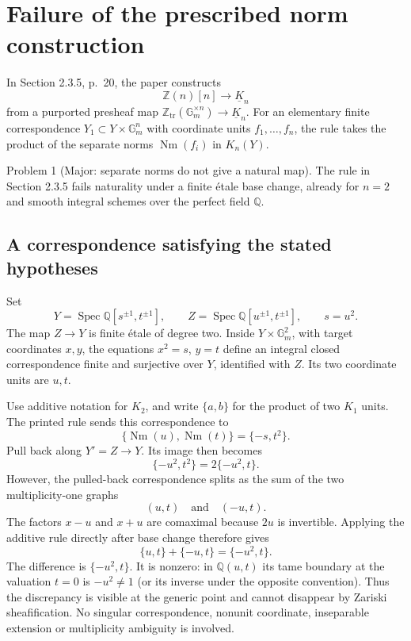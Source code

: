 \documentclass[10pt]{article}
\begin{document}
\section*{Failure of the prescribed norm construction}
In Section 2.3.5, p. 20, the paper constructs \[\mathbb Z(n)[n]\longrightarrow \underline K_n \tag{2.16}\] from a purported presheaf map \(\mathbb Z_{\mathrm{tr}}(\mathbb G_m^{\times n})\to\underline K_n\). For an elementary finite correspondence \(Y_1\subset Y\times\mathbb G_m^n\) with coordinate units \(f_1,\ldots,f_n\), the rule takes the product of the separate norms \(\operatorname{Nm}(f_i)\) in \(K_n(Y)\).\par
Problem 1 (Major: separate norms do not give a natural map).  The rule in Section 2.3.5 fails naturality under a finite étale base change, already for \(n=2\) and smooth integral schemes over the perfect field \(\mathbb Q\).\par
\subsection*{A correspondence satisfying the stated hypotheses}
Set \[Y=\operatorname{Spec}\mathbb Q[s^{\pm1},t^{\pm1}],\qquad
 Z=\operatorname{Spec}\mathbb Q[u^{\pm1},t^{\pm1}],\qquad s=u^2.\] The map \(Z\to Y\) is finite étale of degree two. Inside \(Y\times\mathbb G_m^2\), with target coordinates \(x,y\), the equations \(x^2=s\), \(y=t\) define an integral closed correspondence finite and surjective over \(Y\), identified with \(Z\). Its two coordinate units are \(u,t\).\par
Use additive notation for \(K_2\), and write \(\{a,b\}\) for the product of two \(K_1\) units. The printed rule sends this correspondence to \[\{\operatorname{Nm}(u),\operatorname{Nm}(t)\}
       =\{-s,t^2\}.\] Pull back along \(Y'=Z\to Y\). Its image then becomes \[\{-u^2,t^2\}=2\{-u^2,t\}.\] However, the pulled-back correspondence splits as the sum of the two multiplicity-one graphs \[(u,t)\quad\text{and}\quad(-u,t).\] The factors \(x-u\) and \(x+u\) are comaximal because \(2u\) is invertible. Applying the additive rule directly after base change therefore gives \[\{u,t\}+\{-u,t\}=\{-u^2,t\}.\] The difference is \(\{-u^2,t\}\). It is nonzero: in \(\mathbb Q(u,t)\) its tame boundary at the valuation \(t=0\) is \(-u^2\neq1\) (or its inverse under the opposite convention). Thus the discrepancy is visible at the generic point and cannot disappear by Zariski sheafification. No singular correspondence, nonunit coordinate, inseparable extension or multiplicity ambiguity is involved.\par
\end{document}
